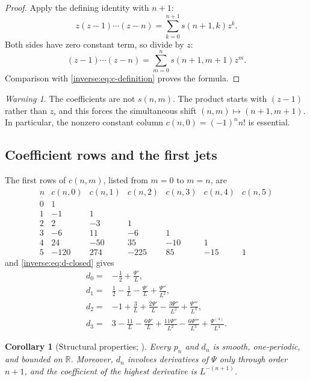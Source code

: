 \documentclass[11pt,oneside]{article}
\newtheorem{corollary}[corollary]{Corollary}
\theoremstyle{definition}
\theoremstyle{remark}
\newtheorem{warning}[warning]{Warning}
\newcommand{\R}{\mathbb R}
\begin{document}
\begin{proof}
Apply the defining identity with $n+1$:
\[
 z(z-1)\cdots(z-n)
 =\sum_{k=0}^{n+1}s(n+1,k)z^k.
\]
Both sides have zero constant term, so divide by $z$:
\[
 (z-1)\cdots(z-n)
 =\sum_{m=0}^n s(n+1,m+1)z^m.
\]
Comparison with \eqref{inverse:eq:c-definition} proves the formula.
\end{proof}

\begin{warning}
The coefficients are not $s(n,m)$.  The product starts with $(z-1)$
rather than $z$, and this forces the simultaneous shift
$(n,m)\mapsto(n+1,m+1)$.  In particular, the nonzero constant column
$c(n,0)=(-1)^nn!$ is essential.
\end{warning}

\subsection{Coefficient rows and the first jets}

The first rows of $c(n,m)$, listed from $m=0$ to $m=n$, are
\[
\begin{array}{c|rrrrrr}
n&c(n,0)&c(n,1)&c(n,2)&c(n,3)&c(n,4)&c(n,5)\\
\hline
0&1\\
1&-1&1\\
2&2&-3&1\\
3&-6&11&-6&1\\
4&24&-50&35&-10&1\\
5&-120&274&-225&85&-15&1
\end{array}
\]
and \eqref{inverse:eq:d-closed} gives
\begin{align}
 d_0={}&-\frac12+\frac{\Psi'}L, \label{inverse:eq:d0-explicit}\\
 d_1={}&\frac12-\frac1L-\frac{\Psi'}L+\frac{\Psi''}{L^2},
 \label{inverse:eq:d1-explicit}\\
 d_2={}&-1+\frac3L+\frac{2\Psi'}L
       -\frac{3\Psi''}{L^2}+\frac{\Psi'''}{L^3},
 \label{inverse:eq:d2-explicit}\\
 d_3={}&3-\frac{11}{L}-\frac{6\Psi'}L
       +\frac{11\Psi''}{L^2}-\frac{6\Psi'''}{L^3}
       +\frac{\Psi^{(4)}}{L^4}. \label{inverse:eq:d3-explicit}
\end{align}

\begin{corollary}[Structural properties; \Formalized]
\label{inverse:cor:jet-structure}
Every $p_n$ and $d_n$ is smooth, one-periodic, and bounded on $\R$.
Moreover, $d_n$ involves derivatives of $\Psi$ only through order $n+1$,
and the coefficient of the highest derivative is $L^{-(n+1)}$.
\end{corollary}
\end{document}
